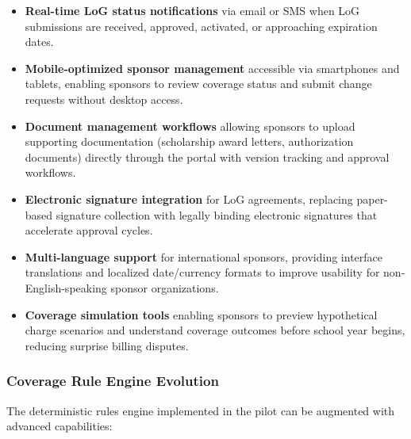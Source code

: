 \begin{itemize}
    \item \textbf{Real-time LoG status notifications} via email or SMS when LoG submissions are received, approved, activated, or approaching expiration dates.
    \item \textbf{Mobile-optimized sponsor management} accessible via smartphones and tablets, enabling sponsors to review coverage status and submit change requests without desktop access.
    \item \textbf{Document management workflows} allowing sponsors to upload supporting documentation (scholarship award letters, authorization documents) directly through the portal with version tracking and approval workflows.
    \item \textbf{Electronic signature integration} for LoG agreements, replacing paper-based signature collection with legally binding electronic signatures that accelerate approval cycles.
    \item \textbf{Multi-language support} for international sponsors, providing interface translations and localized date/currency formats to improve usability for non-English-speaking sponsor organizations.
    \item \textbf{Coverage simulation tools} enabling sponsors to preview hypothetical charge scenarios and understand coverage outcomes before school year begins, reducing surprise billing disputes.
\end{itemize}

\subsubsection{Coverage Rule Engine Evolution}

The deterministic rules engine implemented in the pilot can be augmented with advanced capabilities:

